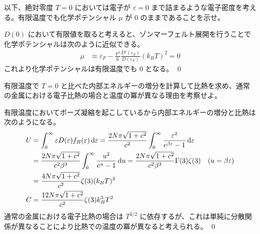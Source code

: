 \documentclass[uplatex,dvipdfmx,a4paper,11pt]{jlreq}
\makeatletter
\numberwithin{equation}{section}
\theoremstyle{definition}
\renewenvironment{proof}[1][\proofname]{\par
  \normalfont
  \topsep6\p@\@plus6\p@ \trivlist
  \item[\hskip\labelsep{\bfseries #1}\@addpunct{\bfseries}]\ignorespaces\quad\par
}{%
  \qed\endtrivlist\@endpefalse
}
\renewcommand\proofname{証明}
\makeatother
\begin{document}
\begin{problem}
以下、絶対零度 $T = 0$ においては電子が $\varepsilon = 0$ まで詰まるような電子密度を考える。有限温度でも化学ポテンシャル $\mu$ が $0$ のままであることを示せ。
\end{problem}
\begin{proof}
  $D(0)$ において有限値を取ると考えると、ゾンマーフェルト展開を行うことで化学ポテンシャルは次のように近似できる。
  \begin{align}
    \mu & \approx \varepsilon_F - \frac{\pi^2}{6}\frac{D'(\varepsilon_F)}{D(\varepsilon_F)}(k_BT)^2 = 0
  \end{align}
  これより化学ポテンシャルは有限温度でも $0$ となる。
\end{proof}

\begin{problem}
有限温度で $T = 0$ と比べた内部エネルギーの増分を計算して比熱を求め、通常の金属における電子比熱の場合と温度の冪が異なる理由を考察せよ。
\end{problem}
\begin{proof}
  有限温度においてボーズ凝縮を起こしているから内部エネルギーの増分と比熱は次のようになる。
  \begin{align}
    U & = \int_{0}^{\infty}\varepsilon D(\varepsilon)f_B(\varepsilon)\dl{\varepsilon} = \frac{2N\pi\sqrt{1 + c^2}}{c^2}\int_{0}^{\infty}\frac{\varepsilon^2}{e^{\beta\varepsilon} - 1}\dl{\varepsilon}                          \\
      & = \frac{2N\pi\sqrt{1 + c^2}}{c^2\beta^3}\int_{0}^{\infty}\frac{u^2}{e^u - 1}\dl{u} = \frac{2N\pi\sqrt{1 + c^2}}{c^2\beta^3}\Gamma(3)\zeta(3)                                                   & (u = \beta\varepsilon) \\
      & = \frac{4N\pi\sqrt{1 + c^2}}{c^2}\zeta(3)(k_BT)^3                                                                                                                                                                       \\
    C & = \frac{12N\pi\sqrt{1 + c^2}}{c^2}\zeta(3)k_B^3T^2
  \end{align}
  通常の金属における電子比熱の場合は $T^{3/2}$ に依存するが、これは単純に分散関係が異なることにより比熱での温度の冪が異なると考えられる。
\end{proof}
\end{document}
